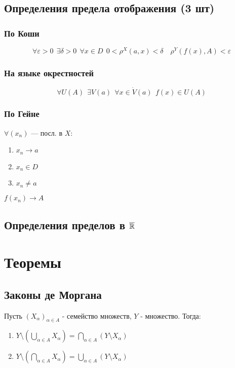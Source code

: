 \subsection{Определения предела отображения (3 шт)}

\subsubsection{По Коши}
    $$\forall \varepsilon>0 \ \ \exists \delta>0 \ \ \forall x\in D \ \ 0<\rho^X(a,x)<\delta \quad \rho^Y(f(x), A) < \varepsilon$$
\subsubsection{На языке окрестностей}
    $$\forall U(A) \ \ \exists V(a) \ \ \forall x\in \dot V(a) \ \ f(x)\in U(A)$$
\subsubsection{По Гейне}
    $\forall (x_n)$ --- посл. в $X$:
    \begin{enumerate}
        \item $x_n\to a$
        \item $x_n\in D$
        \item $x_n\not = a$
    \end{enumerate}
    $f(x_n)\to A$

\subsection{Определения пределов в $\overline{\operatorname*{\mathbb{R}}}$}

\section{Теоремы}

\subsection{Законы де Моргана}

Пусть $(X_\alpha)_{\alpha \in A}$ - семейство множеств, $Y$ - множество. Тогда:

\begin{enumerate}
    \item $Y\setminus(\bigcup\limits_{\alpha \in A}X_\alpha) = \bigcap\limits_{\alpha \in A}(Y\setminus X_\alpha)$
    \item $Y\setminus(\bigcap\limits_{\alpha \in A}X_\alpha) = \bigcup\limits_{\alpha \in A}(Y\setminus X_\alpha)$
\end{enumerate}

